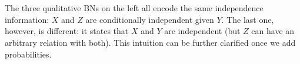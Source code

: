 \begin{center}
    \def\XYZnodes{%
        \node[bnnode] (X) at (0,-1) {$X$};
        \node[bnnode] (Y) at (0,0) {$Y$};
        \node[bnnode] (Z) at (0,1) {$Z$};
    }
    ~~~
    ~~~
    \hspace{2cm}
\end{center}

The three qualitative BNs on the left all encode the same independence information:
$X$ and $Z$ are conditionally independent given $Y$.
The last one, however, is different: it states that $X$ and $Y$ are independent (but $Z$ can have an arbitrary relation with both).
This intuition can be further clarified once we add probabilities.

